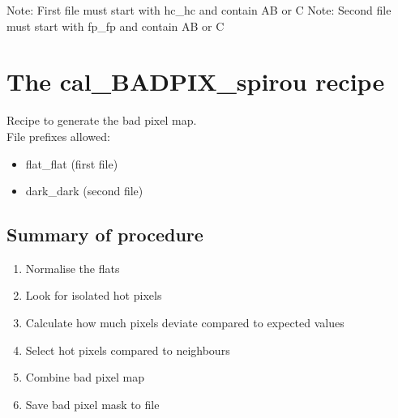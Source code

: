 \noindent Note: First file must start with hc\_hc and contain AB or C
\noindent Note: Second file must start with fp\_fp and contain AB or C







\clearpage
\newpage
\section{The cal\_BADPIX\_spirou recipe}
\label{section:cal_BADPIX_spirou}

Recipe to generate the bad pixel map. \\


\noindent File prefixes allowed:
\begin{itemize}
	\item flat\_flat (first file)
	\item dark\_dark (second file)
\end{itemize}

\subsection{Summary of procedure}
\begin{enumerate}
	\item Normalise the flats
	\item Look for isolated hot pixels
	\item Calculate how much pixels deviate compared to expected values
	\item Select hot pixels compared to neighbours
	\item Combine bad pixel map
	\item Save bad pixel mask to file
\end{enumerate}

